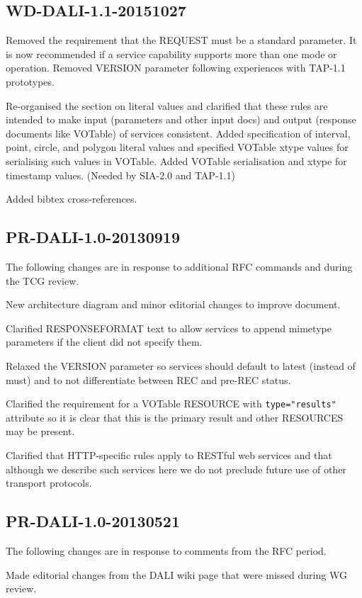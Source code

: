 \documentclass[11pt,letter]{ivoa}
\begin{document}
\subsection{WD-DALI-1.1-20151027}

Removed the requirement that the REQUEST must be a standard parameter. It is
now recommended if a service capability supports more than one mode or
operation. Removed VERSION parameter following experiences with TAP-1.1
prototypes.

Re-organised the section on literal values and clarified that these rules
are intended to make input (parameters and other input docs) and output
(response documents like VOTable) of services consistent. Added specification
of interval, point, circle, and polygon literal values and specified VOTable
xtype values for serialising such values in VOTable. Added VOTable serialisation
and xtype for timestamp values. (Needed by SIA-2.0 and TAP-1.1)

Added bibtex cross-references.

\subsection{PR-DALI-1.0-20130919}
The following changes are in response to additional RFC commands and during the
TCG review.

New architecture diagram and minor editorial changes to improve document.

Clarified RESPONSEFORMAT text to allow services to append mimetype parameters if
the client did not specify them.

Relaxed the VERSION parameter so services should default to latest (instead of
must) and to not differentiate between REC and pre-REC status.

Clarified the requirement for a VOTable RESOURCE with \verb|type="results"| attribute
so it is clear that this is the primary result and other RESOURCES may be
present.

Clarified that HTTP-specific rules apply to RESTful web services and that
although we describe such services here we do not preclude future use of other
transport protocols.

\subsection{PR-DALI-1.0-20130521}
The following changes are in response to comments from the RFC period.

Made editorial changes from the DALI wiki page that were missed during WG
review.
\end{document}
